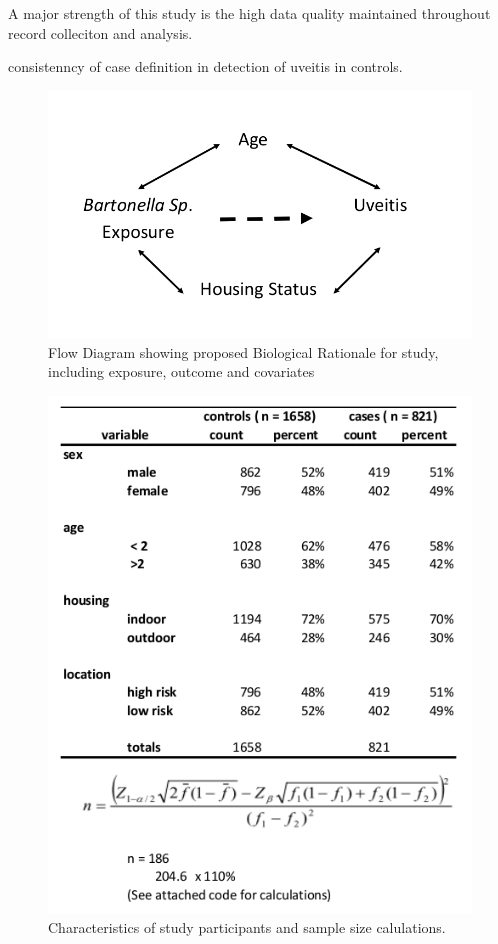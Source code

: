 \documentclass[11pt,twocolumn]{article}
\begin{document}
		A major strength of this study is the high data quality maintained throughout record colleciton and analysis.

		consistenncy of case definition in 
		detection of uveitis in controls.
\newpage

\begin{figure}[h!]
	\centering
	\includegraphics[scale=0.3]{figure1.jpg}
	\caption{Flow Diagram showing proposed Biological Rationale for study, including exposure, outcome and covariates }
	\label{fig:1}
\end{figure}

\begin{figure}[h!]
	\centering
	\includegraphics[scale=0.5]{table1.jpg}
	\caption{Characteristics of study participants and sample size calulations.}
	\label{tab:1}
\end{figure}
 
\end{document}
